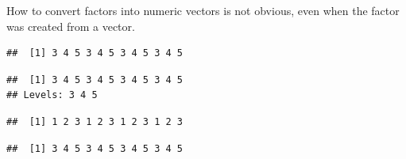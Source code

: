 \documentclass[krantz2]{krantz}\usepackage{knitr}
\begin{document}
\begin{warningbox}
How to convert factors into numeric vectors is not obvious, even when the factor was created from a  vector.

\begin{knitrout}\footnotesize
{}\color{fgcolor}\begin{kframe}
\begin{alltt}
 \hlkwb{<-} \hlstd{(}\hlopt{:}\hlstd{,} \hlstd{)}
\end{alltt}
\begin{verbatim}
##  [1] 3 4 5 3 4 5 3 4 5 3 4 5
\end{verbatim}
\begin{alltt}
 \hlkwb{<-} 
\end{alltt}
\begin{verbatim}
##  [1] 3 4 5 3 4 5 3 4 5 3 4 5
## Levels: 3 4 5
\end{verbatim}
\begin{alltt}
\end{alltt}
\begin{verbatim}
##  [1] 1 2 3 1 2 3 1 2 3 1 2 3
\end{verbatim}
\begin{alltt}
\hlstd{(}
\end{alltt}
\begin{verbatim}
##  [1] 3 4 5 3 4 5 3 4 5 3 4 5
\end{verbatim}
\end{kframe}
\end{knitrout}
\end{warningbox}
\end{document}

